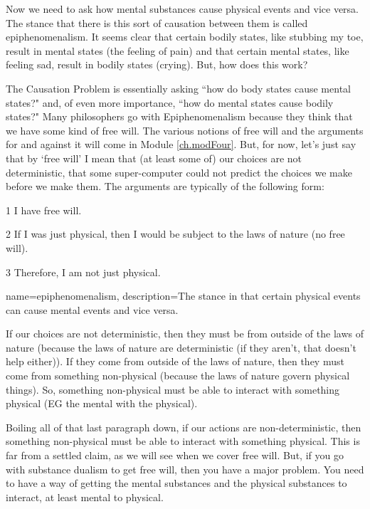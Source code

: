 Now we need to ask how mental substances cause physical events and vice versa. The stance that there is this sort of causation between them is called \gls{epiphenomenalism}. It seems clear that certain bodily states, like stubbing my toe, result in mental states (the feeling of pain) and that certain mental states, like feeling sad, result in bodily states (crying). But, how does this work?

The Causation Problem is essentially asking ``how do body states cause mental states?" and, of even more importance, ``how do mental states cause bodily states?" Many philosophers go with Epiphenomenalism because they think that we have some kind of free will. The various notions of free will and the arguments for and against it will come in Module \ref{ch.modFour}. But, for now, let's just say that by `free will' I mean that (at least some of) our choices are not deterministic, that some super-computer could not predict the choices we make before we make them. The arguments are typically of the following form: 

\begin{earg}
    \item[1 ] I have free will.
    \item[2 ] If I was just physical, then I would be subject to the laws of nature (no free will).
    \item[3 ] Therefore, I am not just physical.
\end{earg}

{
name=epiphenomenalism,
description={The stance in that certain physical events can cause mental events and vice versa.}
}

If our choices are not deterministic, then they must be from outside of the laws of nature (because the laws of nature are deterministic (if they aren't, that doesn't help either)).  If they come from outside of the laws of nature, then they must come from something non-physical (because the laws of nature govern physical things). So, something non-physical must be able to interact with something physical (EG the mental with the physical).

Boiling all of that last paragraph down, if our actions are non-deterministic, then something non-physical must be able to interact with something physical. This is far from a settled claim, as we will see when we cover free will. But, if you go with substance dualism to get free will, then you have a major problem. You need to have a way of getting the mental substances and the physical substances to interact, at least mental to physical. 

